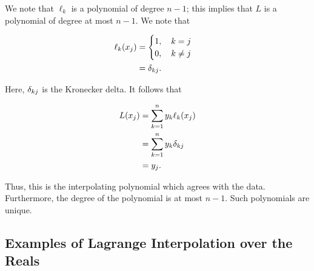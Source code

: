\noindent
We note that $\ell_{k}$ is a polynomial of degree $n-1$;
this implies that $L$ is a polynomial of degree at most $n-1$.
We note that

\begin{align}
    \ell_{k}(x_{j}) &=
        \begin{cases} 1, \quad k = j \\ 0, \quad k\ne j \end{cases}
            \nonumber\\
        &= \delta_{kj}.
\end{align}

\noindent
Here, $\delta_{kj}$ is the Kronecker delta.
It follows that 

\begin{align}
    L(x_{j}) &= \sum_{k=1}^{n}y_{k}\ell_{k}(x_{j}) \nonumber\\
        &= \sum_{k=1}^{n} y_{k}\delta_{kj} \nonumber\\
        &= y_{j}.
\end{align}

\noindent
Thus, this is the interpolating polynomial which agrees
with the data.
Furthermore, the degree of the polynomial is at most $n-1$.
Such polynomials are unique.

\subsection{Examples of Lagrange Interpolation over the Reals}

